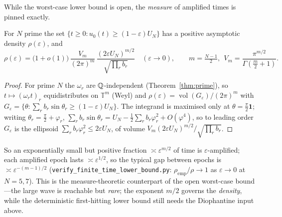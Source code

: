 While the worst-case lower bound is open, the \emph{measure} of amplified times is pinned exactly.

\begin{proposition}\label{prop:reach-density}
For $N$ prime the set $\{t\ge0:u_0(t)\ge(1-\varepsilon)U_N\}$ has a positive asymptotic density
$\rho(\varepsilon)$, and
\[
  \rho(\varepsilon)=\bigl(1+o(1)\bigr)\,\frac{V_m}{(2\pi)^m}\,\frac{(2\varepsilon U_N)^{m/2}}{\sqrt{\textstyle\prod_r b_r}}
  \quad(\varepsilon\to0),\qquad m=\tfrac{N-1}2,\ \ V_m=\frac{\pi^{m/2}}{\Gamma(\tfrac m2+1)} .
\]
\end{proposition}
\begin{proof}
For prime $N$ the $\omega_r$ are $\mathbb{Q}$-independent (Theorem~\ref{thm:prime}), so $t\mapsto(\omega_r t)_r$
equidistributes on $\mathbb T^m$ (Weyl) and $\rho(\varepsilon)=\operatorname{vol}(G_\varepsilon)/(2\pi)^m$ with
$G_\varepsilon=\{\theta:\sum_r b_r\sin\theta_r\ge(1-\varepsilon)U_N\}$. The integrand is maximised only at
$\theta=\tfrac\pi2\mathbf 1$; writing $\theta_r=\tfrac\pi2+\varphi_r$, $\sum_r b_r\sin\theta_r=U_N-\tfrac12\sum_r
b_r\varphi_r^2+O(\varphi^4)$, so to leading order $G_\varepsilon$ is the ellipsoid $\sum_r b_r\varphi_r^2\le2\varepsilon
U_N$, of volume $V_m(2\varepsilon U_N)^{m/2}/\sqrt{\prod_r b_r}$.
\end{proof}

\noindent So an exponentially small but positive fraction $\asymp\varepsilon^{m/2}$ of time is
$\varepsilon$-amplified; each amplified epoch lasts $\asymp\varepsilon^{1/2}$, so the typical gap between
epochs is $\asymp\varepsilon^{-(m-1)/2}$
(\texttt{verify\_finite\_time\_lower\_bound.py}: $\rho_{\mathrm{emp}}/\rho\to1$ as $\varepsilon\to0$ at
$N=5,7$). This is the measure-theoretic counterpart of the open worst-case bound---the large wave is reachable
but \emph{rare}; the exponent $m/2$ governs the \emph{density}, while the deterministic first-hitting lower
bound still needs the Diophantine input above.

